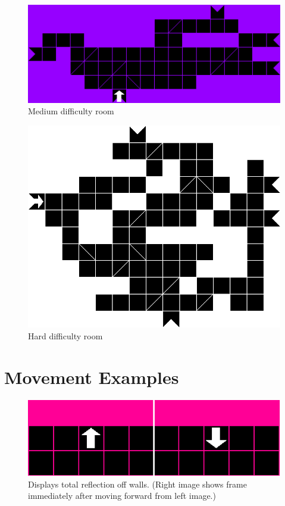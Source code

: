 \documentclass{scrreprt}
\begin{document}
		\begin{figure}[!ht]
			\centering
			\includegraphics[width=\columnwidth]{medium}
			\caption{Medium difficulty room}
			\label{fig:medium}
		\end{figure}
	
		\begin{figure}[!ht]
			\centering
			\includegraphics[width=\columnwidth]{hard}
			\caption{Hard difficulty room}
			\label{fig:hard}
		\end{figure}
	
	\chapter{Movement Examples}\label{chp:movements}
	
		\begin{figure}[!ht]
			\centering
			\includegraphics[width=\columnwidth]{wall}
			\caption{Displays total reflection off walls. (Right image shows frame immediately after moving forward from left image.)}
			\label{fig:wall}
		\end{figure}
	
\end{document}
